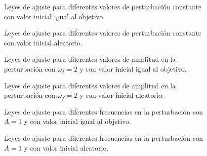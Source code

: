\documentclass[letterpaper,11pt]{article} %
\begin{document}
\newpage
\begin{figure}[h]
	\centering
	\captionsetup{justification=centering}
	\caption{Leyes de ajuste para diferentes valores de perturbación constante con valor inicial igual al objetivo.}
	\label{estado7}
\end{figure}
\newpage
\begin{figure}[h]
	\centering
	\captionsetup{justification=centering}
	\caption{Leyes de ajuste para diferentes valores de perturbación constante con valor inicial aleatorio.}
	\label{estado8}
\end{figure}
\newpage
\begin{figure}[h]
	\centering
	\captionsetup{justification=centering}
	\caption{Leyes de ajuste para diferentes valores de amplitud en la perturbación con $\omega_f=2$ y con valor inicial igual al objetivo.}
	\label{estado9}
\end{figure}
\newpage
\begin{figure}[h]
	\centering
	\captionsetup{justification=centering}
	\caption{Leyes de ajuste para diferentes valores de amplitud en la perturbación con $\omega_f=2$ y con valor inicial aleatorio.}
	\label{estado10}
\end{figure}
\newpage
\begin{figure}[h]
	\centering
	\captionsetup{justification=centering}
	\caption{Leyes de ajuste para diferentes frecuencias en la perturbación con $A = 1$ y  con valor inicial igual al objetivo.}
	\label{estado11}
\end{figure}
\newpage
\begin{figure}[h]
	\centering
	\captionsetup{justification=centering}
	\caption{Leyes de ajuste para diferentes frecuencias en la perturbación con $A = 1$ y con valor inicial aleatorio.}
	\label{estado12}
\end{figure}
\end{document}
